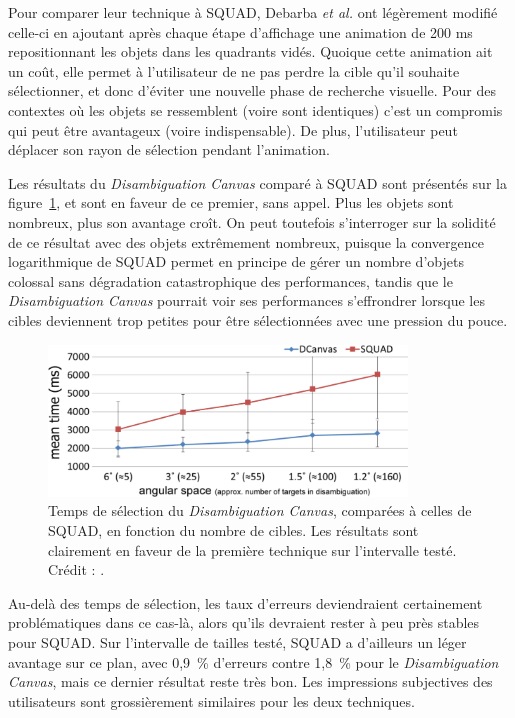 	Pour comparer leur technique à SQUAD, Debarba \emph{et al.} ont légèrement modifié celle-ci en ajoutant après chaque étape \og d'affichage \fg{} une animation de 200 ms repositionnant les objets dans les quadrants vidés. Quoique cette animation ait un coût, elle permet à l'utilisateur de ne pas perdre la cible qu'il souhaite sélectionner, et donc d'éviter une nouvelle phase de recherche visuelle. Pour des contextes où les objets se ressemblent (voire sont identiques) c'est un compromis qui peut être avantageux (voire indispensable). De plus, l'utilisateur peut déplacer son rayon de sélection pendant l'animation.
	
	Les résultats du \emph{Disambiguation Canvas} comparé à SQUAD sont présentés sur la figure~\ref{fig:dCanvasSPerf}, et sont en faveur de ce premier, sans appel. Plus les objets sont nombreux, plus son avantage croît. On peut toutefois s'interroger sur la solidité de ce résultat avec des objets extrêmement nombreux, puisque la convergence logarithmique de SQUAD permet en principe de gérer un nombre d'objets colossal sans dégradation catastrophique des performances, tandis que le \emph{Disambiguation Canvas} pourrait voir ses performances s'effrondrer lorsque les cibles deviennent trop petites pour être sélectionnées avec une pression du pouce.	
	
	\begin{figure}[!htb]
		\centering
		\includegraphics[width=0.85\textwidth]{figures/ch2/dCanvasSPerf}
		\caption[\emph{Disambiguation Canvas} -- performances II]{Temps de sélection du \emph{Disambiguation Canvas}, comparées à celles de SQUAD, en fonction du nombre de cibles. Les résultats sont clairement en faveur de la première technique sur l'intervalle testé. Crédit : \cite{debarba2013disambiguation}.}
		\label{fig:dCanvasSPerf}
	\end{figure}
	
	Au-delà des temps de sélection, les taux d'erreurs deviendraient certainement problématiques dans ce cas-là, alors qu'ils devraient rester à peu près stables pour SQUAD. Sur l'intervalle de tailles testé, SQUAD a d'ailleurs un léger avantage sur ce plan, avec 0,9~\%{} d'erreurs contre 1,8~\%{} pour le \emph{Disambiguation Canvas}, mais ce dernier résultat reste très bon. Les impressions subjectives des utilisateurs sont grossièrement similaires pour les deux techniques.
		 
